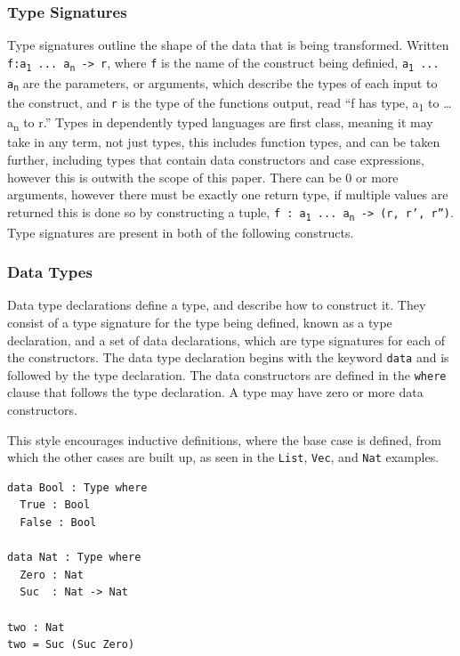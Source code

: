 \documentclass[a4paper]{article}
\begin{document}
\subsubsection{Type Signatures}
\label{sec:org6cd40f9}
Type signatures outline the shape of the data that is being transformed.
Written \texttt{f:a\textsubscript{1} ... a\textsubscript{n} -> r}, where \texttt{f} is the name of the construct being definied, \texttt{a\textsubscript{1} ...  a\textsubscript{n}} are
the parameters, or arguments, which describe the types of each input to the construct, and \texttt{r} is the type of the functions output, read ``f has type, a\textsubscript{1} 
to \ldots{} a\textsubscript{n} to r.'' Types in dependently typed languages are first class,
meaning it may take in any term, not just types, this includes function
types, and can be taken further, including types that contain data constructors and case expressions, however this is outwith the scope of
this paper. There can be 0 or more arguments,
however there must be exactly one return type, if multiple values are 
returned this is done so by constructing a tuple,
\texttt{f : a\textsubscript{1} ... a\textsubscript{n} -> (r, r', r'')}. Type signatures are present in both
of the following constructs.

\subsubsection{Data Types}
\label{sec:orga233947}
Data type declarations define a type, and describe how to construct it.
They consist of a type signature for the type being 
defined, known as a type declaration, and a set of data declarations, 
which are type signatures for each of the constructors.
The data type declaration begins with the keyword \texttt{data} and is followed by 
the type declaration. The data constructors are defined in the \texttt{where} 
clause that follows the type declaration. A type may have zero or more
data constructors. 

This style encourages inductive definitions, where the base case is 
defined, from which the other cases are built up, as seen in the \texttt{List},
\texttt{Vec}, and \texttt{Nat} examples.

\begin{center}
\begin{verbatim}
data Bool : Type where
  True : Bool
  False : Bool

data Nat : Type where
  Zero : Nat
  Suc  : Nat -> Nat

two : Nat
two = Suc (Suc Zero)
\end{verbatim}
\end{center}
\end{document}
